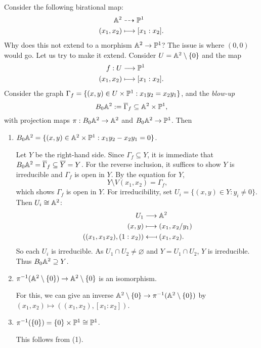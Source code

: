\begin{example}
  Consider the following birational map:
  \begin{align*}
    \mathbb{A}^2
    &\dashrightarrow \mathbb{P}^1 \\
    (x_1, x_2) &\longmapsto [x_1 : x_2].
  \end{align*}
  Why does this not extend to a morphism
  $\mathbb{A}^2 \to \mathbb{P}^1$?
  The issue is where $(0, 0)$ would go.
  Let us try to make it extend. Consider
  $U = \mathbb{A}^2 \setminus \{0\}$
  and the map
  \begin{align*}
    f : U &\longrightarrow \mathbb{P}^1 \\
    (x_1, x_2) &\longmapsto [x_1 : x_2].
  \end{align*}
  Consider the graph $\Gamma_f = \{(x, y) \in U \times \mathbb{P}^1 : x_1 y_2 = x_2 y_1\}$,
  and the \emph{blow-up}
  \[
    B_0 \mathbb{A}^2 := \overline{\Gamma}_f \subseteq \mathbb{A}^2 \times \mathbb{P}^1,
  \]
  with projection maps
  $\pi : B_0 \mathbb{A}^2 \to \mathbb{A}^2$
  and $B_0 \mathbb{A}^2 \to \mathbb{P}^1$. Then
  \begin{enumerate}
    \item $B_0 \mathbb{A}^2 = \{(x, y) \in \mathbb{A}^2 \times \mathbb{P}^1 : x_1 y_2 - x_2 y_1 = 0\}$.

      Let $Y$ be the right-hand side.
      Since $\Gamma_f \subseteq Y$, it is
      immediate that $B_0 \mathbb{A}^2 = \overline{\Gamma}_f \subseteq \overline{Y} = Y$.
      For the reverse inclusion, it suffices
      to show $Y$ is irreducible
      and $\Gamma_f$ is open in $Y$.
      By the equation for $Y$,
      \[
        Y \setminus V(x_1, x_2)
        = \Gamma_f,
      \]
      which shows $\Gamma_f$ is open in $Y$.
      For irreducibility, set
      $U_i = \{(x, y) \in Y : y_i \ne 0\}$.
      Then $U_i \cong \mathbb{A}^2$:
      \begin{align*}
        U_1 &\longrightarrow \Affine^2 \\
        (x, y) &\longmapsto (x_1, x_2 / y_1) \\
        ((x_1, x_1 x_2), (1 : x_2)) &\mathrel{\reflectbox{\ensuremath{\longmapsto}}} (x_1, x_2).
      \end{align*}
      So each $U_i$ is irreducible.
      As $U_1 \cap U_2 \ne \varnothing$ 
      and $Y = U_1 \cap U_2$,
      $Y$ is irreducible.
      Thus $B_0 \mathbb{A}^2 \supseteq Y$.
    \item $\pi^{-1}(\mathbb{A}^2 \setminus \{0\}) \to \mathbb{A}^2 \setminus \{0\}$
      is an isomorphism.

      For this, we can give an inverse
      $\mathbb{A}^2 \setminus \{0\} \to \pi^{-1}(\mathbb{A}^2 \setminus \{0\})$
      by $(x_1, x_2) \mapsto ((x_1, x_2), [x_1 : x_2])$.
    \item $\pi^{-1}(\{0\}) = \{0\} \times \mathbb{P}^1 \cong \mathbb{P}^1$.

      This follows from (1).
  \end{enumerate}
\end{example}

